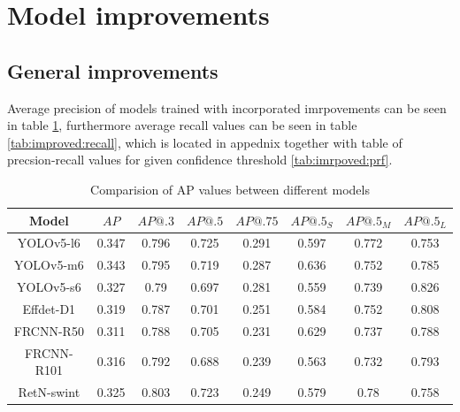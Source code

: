 \section{Model improvements}
\label{sec:model_improvements_results}
\subsection{General improvements}
Average precision of models trained with incorporated imrpovements can be seen in table \ref{tab:improved:precision}, furthermore average recall values can be seen in table \ref{tab:improved:recall}, which is located in appednix together with table of precsion-recall values for given confidence threshold \ref{tab:imrpoved:prf}.
\begin{table}[H]
    \centering
    \begin{tabular}{|c|c|c|c|c|c|c|c|}
        \hline
        Model      & $AP$  & $AP@.3$ & $AP@.5$ & $AP@.75$ & $AP@.5_S$ & $AP@.5_M$ & $AP@.5_L$ \\ \hline
        YOLOv5-l6  & 0.347 & 0.796   & 0.725   & 0.291    & 0.597     & 0.772     & 0.753     \\ \hline
        YOLOv5-m6  & 0.343 & 0.795   & 0.719   & 0.287    & 0.636     & 0.752     & 0.785     \\ \hline
        YOLOv5-s6  & 0.327 & 0.79    & 0.697   & 0.281    & 0.559     & 0.739     & 0.826     \\ \hline
        Effdet-D1  & 0.319 & 0.787   & 0.701   & 0.251    & 0.584     & 0.752     & 0.808     \\ \hline
        FRCNN-R50  & 0.311 & 0.788   & 0.705   & 0.231    & 0.629     & 0.737     & 0.788     \\ \hline
        FRCNN-R101 & 0.316 & 0.792   & 0.688   & 0.239    & 0.563     & 0.732     & 0.793     \\ \hline
        RetN-swint & 0.325 & 0.803   & 0.723   & 0.249    & 0.579     & 0.78      & 0.758     \\ \hline
    \end{tabular}
    \caption{Comparision of AP values between different models}
    \label{tab:improved:precision}
\end{table}



